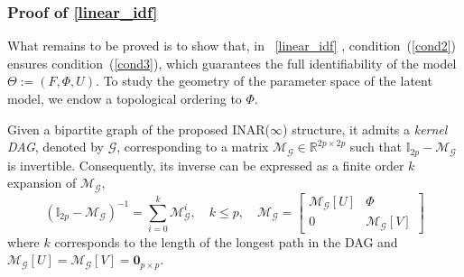 \documentclass[10pt]{article}
\numberwithin{figure}{section}
\begin{document}
\subsubsection{Proof of \autoref{linear_idf}}

What remains to be proved is to show that,  in ~\autoref{linear_idf} , condition~(\ref{cond2}) ensures condition~(\ref{cond3}), which guarantees the full identifiability of the model $\Theta:=(F,\Phi, U)$. To study the geometry of the parameter space of the latent model, we endow a topological ordering to $\Phi$.

\begin{alemma}
    Given a bipartite graph of the proposed INAR($\infty$) structure, it admits a \emph{kernel DAG}, denoted by $\mathscr{G}$, corresponding to a matrix $\mathcal{M}_{\mathscr{G}} \in \mathbb{R}^{2p \times 2p}$ such that $\mathbb{I}_{2p} - \mathcal{M}_{\mathscr{G}}$ is invertible.  
Consequently, its inverse can be expressed as a finite order $k$ expansion of $\mathcal{M}_{\mathscr{G}}$,
\[
(\mathbb{I}_{2p}-\mathcal{M}_{\mathscr{G}})^{-1} = \sum_{i=0}^{k} \mathcal{M}_{\mathscr{G}}^i, \quad k \le p,\quad \mathcal{M}_{\mathscr{G}} = \begin{bmatrix}
\mathcal{M}_{\mathscr{G}}[U] & \Phi\\
0 &\mathcal{M}_{\mathscr{G}}[V] 
\end{bmatrix} 
\]
where $k$ corresponds to the length of the longest path in the DAG and $\mathcal{M}_{\mathscr{G}}[U] = \mathcal{M}_{\mathscr{G}}[V]= \mathbf{0}_{p\times p}$.
\end{alemma}
\end{document}
